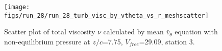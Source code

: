 \begin{figure}[H]
\centering
\texttt{[image: figs/run\_28/run\_28\_turb\_visc\_by\_vtheta\_vs\_r\_meshscatter]}
\caption{Scatter plot of total viscosity $\nu$ calculated by mean $\bar{v}_{\theta}$ equation with non-equilibrium pressure at $z/c$=7.75, $V_{free}$=29.09, station 3.}
\label{fig:run_28_turb_visc_by_vtheta_vs_r_meshscatter}
\end{figure}


